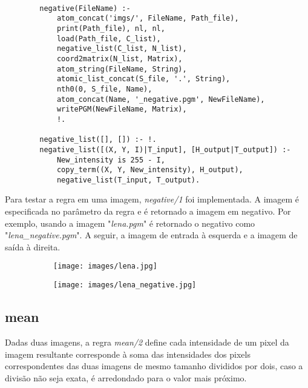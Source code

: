 \documentclass{article}
\begin{document}
        \begin{lstlisting}[frame=single] % Início da região de uso de trecho de código.

        negative(FileName) :-
            atom_concat('imgs/', FileName, Path_file),
            print(Path_file), nl, nl,
            load(Path_file, C_list),
            negative_list(C_list, N_list),
            coord2matrix(N_list, Matrix),
            atom_string(FileName, String),
            atomic_list_concat(S_file, '.', String),
            nth0(0, S_file, Name),
            atom_concat(Name, '_negative.pgm', NewFileName),
            writePGM(NewFileName, Matrix),
            !.
            
        negative_list([], []) :- !.
        negative_list([(X, Y, I)|T_input], [H_output|T_output]) :-
            New_intensity is 255 - I,
            copy_term((X, Y, New_intensity), H_output),
            negative_list(T_input, T_output).    
        \end{lstlisting}
        
        Para testar a regra em uma imagem, \textit{negative/1} foi
        implementada. A imagem é especificada no parâmetro da regra e é
        retornado a imagem em negativo. Por exemplo, usando a imagem
        "\textit{lena.pgm}" é retornado o negativo como
        "\textit{lena\_negative.pgm}". A seguir, a imagem de entrada à esquerda
        e a imagem de saída à direita.
        
        \begin{figure}[h]
        \centering
            \begin{subfigure}
            \centering
            \texttt{[image: images/lena.jpg]}
            \end{subfigure}
            \begin{subfigure}
            \centering
            \texttt{[image: images/lena\_negative.jpg]}
            \end{subfigure}
        \end{figure}
        
    \newpage
    \subsection*{mean}
        Dadas duas imagens, a regra \textit{mean/2} define cada intensidade de
        um pixel da imagem resultante corresponde à soma das intensidades dos
        pixels correspondentes das duas imagens de mesmo tamanho divididos por
        dois, caso a divisão não seja exata, é arredondado para o valor mais
        próximo.
\end{document}
